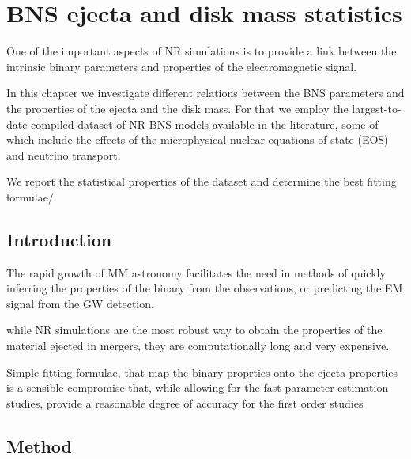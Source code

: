 
\chapter{\ac{BNS} ejecta and disk mass statistics} %

\label{ch:stat} %

One of the important aspects of \ac{NR} simulations is to provide a link between the intrinsic binary parameters and properties of the electromagnetic signal.

In this chapter we investigate different relations between the \ac{BNS} parameters 
and the properties of the ejecta and the disk mass.
For that we employ the largest-to-date compiled dataset of \ac{NR} \ac{BNS} models 
available in the literature, some of which include the effects of the 
microphysical nuclear equations of state (EOS) and neutrino transport.

We report the statistical properties of the dataset and determine the 
best fitting formulae/ 


\section{Introduction}

The rapid growth of \ac{MM} astronomy facilitates the need in methods of quickly inferring the properties 
of the binary from the observations, or predicting the \ac{EM} signal from the \ac{GW} detection.

while \ac{NR} simulations are the most robust way to obtain the properties of the material
ejected in mergers, they are computationally long and very expensive. 

Simple fitting formulae, that map the binary proprties onto the ejecta properties is a sensible
compromise that, while allowing for the fast parameter estimation studies, provide a reasonable 
degree of accuracy for the first order studies 



\section{Method} 

